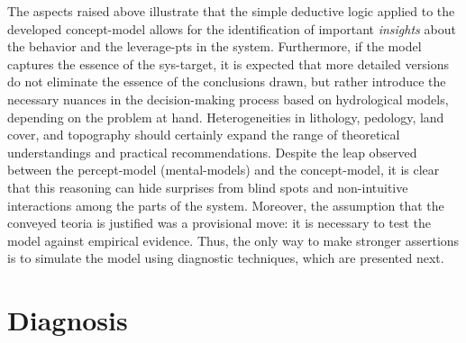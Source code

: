 \documentclass[./main_en.tex]{subfiles}
\begin{document}
\par The aspects raised above illustrate that the simple deductive logic applied to the developed \gls{concept-model} allows for the identification of important \textit{insights} about the behavior and the \gls{leverage-pts} in the \gls{system}. Furthermore, if the \gls{model} captures the essence of the \gls{sys-target}, it is expected that more detailed versions do not eliminate the essence of the conclusions drawn, but rather introduce the necessary nuances in the decision-making process based on hydrological models, depending on the problem at hand. Heterogeneities in lithology, pedology, land cover, and topography should certainly expand the range of theoretical understandings and practical recommendations. Despite the leap observed between the \gls{percept-model} (\gls{mental-models}) and the \gls{concept-model}, it is clear that this reasoning can hide surprises from blind spots and non-intuitive interactions among the parts of the \gls{system}. Moreover, the assumption that the conveyed \gls{teoria} is justified was a provisional move: it is necessary to test the \gls{model} against empirical evidence. Thus, the only way to make stronger assertions is to simulate the \gls{model} using diagnostic techniques, which are presented next.

\section{Diagnosis} \label{sec:sys:diags}
\end{document}
